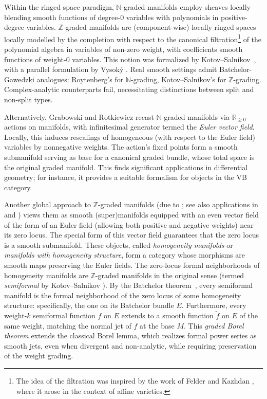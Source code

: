 \documentclass[a4paper,12pt]{amsart}
\newcommand{\Z}{{\mathbb Z}}
\begin{document}
\smallskip\noindent Within the ringed space paradigm, $\mathbb{N}$-graded manifolds employ sheaves locally blending smooth functions of degree-$0$ variables with polynomials in positive-degree variables. $\mathbb{Z}$-graded manifolds are (component-wise) locally ringed spaces locally modelled by the completion with respect to the canonical filtration\footnote{The idea of the filtration was inspired by the work of Felder and Kazhdan \cite{felder-kazhdan}, where it arose in the context of affine varieties.} of the polynomial algebra in variables of non-zero weight, with coefficients smooth functions of weight-$0$ variables. This notion was formalized by Kotov--Salnikov~\cite{KS2024}, with a parallel formulation by Vysok\'y \cite{vysoky}. Real smooth settings admit Batchelor-Gawedzki analogues: Roytenberg's for $\mathbb{N}$-grading, Kotov--Salnikov's for $\mathbb{Z}$-grading. Complex-analytic counterparts fail, necessitating distinctions between split and non-split types.

\smallskip\noindent
 Alternatively, Grabowski and Rotkiewicz \cite{grab-hom} recast $\mathbb{N}$-graded manifolds via $\mathbb{R}_{\geq 0}$-actions on manifolds, with infinitesimal generator termed the \emph{Euler vector field}. Locally, this induces rescalings of homogeneous (with respect to the Euler field) variables by nonnegative weights. The action's fixed points form a smooth submanifold serving as base for a canonical graded bundle, whose total space is the original graded manifold. This finds significant applications in differential geometry; for instance, it provides a suitable formalism for objects in the VB category.
 

\smallskip\noindent Another global approach to $\Z$-graded manifolds (due to \cite{Voronov2002}; 
see also applications in \cite{GrabowskaGrabowski2024, GrabowskaGrabowski2025, Grabowskaetal2025, KS-HCP} and \cite{BruceGrabowskiRotkiewicz2016, BruceGrabowskaGrabowski2018})
views them as smooth (super)manifolds equipped with an even vector field of the form of an Euler field (allowing both positive and negative weights) near its zero locus.
The special form of this vector field guarantees that the zero 
locus is a smooth submanifold. These objects, called 
\emph{homogeneity manifolds} or \emph{manifolds with homogeneity 
structure}, form a category whose morphisms are smooth maps 
preserving the Euler fields. 
The zero-locus formal neighborhoods of homogeneity manifolds are 
$\Z$-graded manifolds in the original sense (termed \emph{semiformal} 
by Kotov--Salnikov \cite{KS2024}). By the Batchelor theorem~\cite{KS2024}, every semiformal manifold is the formal neighborhood of the zero locus of some homogeneity structure: specifically, the one on its Batchelor bundle $E$. Furthermore, every weight-$k$ semiformal function $f$ on $E$ 
extends to a smooth function $\widetilde{f}$ on $E$ of the same 
weight, matching the normal jet of $f$ at the base $M$. 
This \emph{graded Borel theorem} \cite{borel1901, bourbaki1967} extends the classical Borel 
lemma, which realizes formal power series as smooth jets, even 
when divergent and non-analytic, while requiring preservation 
of the weight grading.
\end{document}

